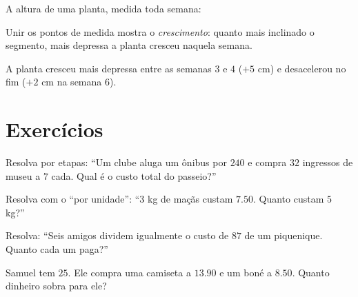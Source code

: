 \begin{example}\label{ex:g5:data:line}
A altura de uma planta, medida toda semana:

\begin{omfigure}

{\small Unir os pontos de medida mostra o \emph{crescimento}: quanto
mais inclinado o segmento, mais depressa a planta cresceu naquela
semana.}
\end{omfigure}

A planta cresceu mais depressa entre as semanas $3$ e $4$ ($+5$ cm) e
desacelerou no fim ($+2$ cm na semana $6$).
\end{example}

\section{Exercícios}

\begin{exercise}[$\star$]\label{exo:g5:data:1}
Resolva por etapas: ``Um clube aluga um ônibus por $240$ e compra
$32$ ingressos de museu a $7$ cada. Qual é o custo total do
passeio?''
\end{exercise}

\begin{exercise}[$\star$]\label{exo:g5:data:2}
Resolva com o ``por unidade'': ``$3$ kg de maçãs custam $7.50$.
Quanto custam $5$ kg?''
\end{exercise}

\begin{exercise}[$\star$]\label{exo:g5:data:3}
Resolva: ``Seis amigos dividem igualmente o custo de $87$ de um
piquenique. Quanto cada um paga?''
\end{exercise}

\begin{exercise}[$\star$]\label{exo:g5:data:4}
Samuel tem $25$. Ele compra uma camiseta a $13.90$ e um boné a
$8.50$. Quanto dinheiro sobra para ele?
\end{exercise}

